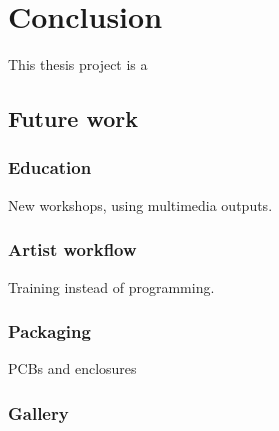\chapter{Conclusion}

This thesis project is a

\section{Future work}

\subsection{Education}

New workshops, using multimedia outputs.

\subsection{Artist workflow}

Training instead of programming.

\subsection{Packaging}

PCBs and enclosures

\subsection{Gallery}
